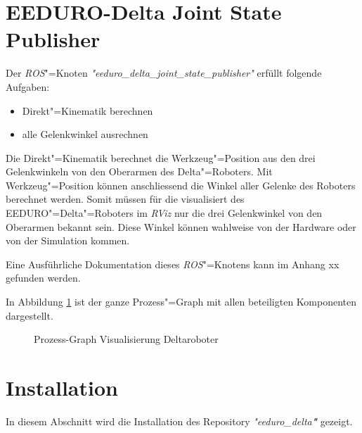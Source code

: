 \section{EEDURO-Delta Joint State Publisher}
Der \textit{ROS}"=Knoten \textit{\textit{"}eeduro\_delta\_joint\_state\_publisher\textit{"}} erfüllt folgende Aufgaben:
\begin{itemize}
\item Direkt"=Kinematik berechnen
\item alle Gelenkwinkel ausrechnen
\end{itemize}
Die Direkt"=Kinematik berechnet die Werkzeug"=Position aus den drei Gelenkwinkeln von den Oberarmen des Delta"=Roboters.
Mit Werkzeug"=Position können anschliessend die Winkel aller Gelenke des Roboters berechnet werden.
Somit müssen für die visualisiert des EEDURO"=Delta"=Roboters im \textit{RViz} nur die drei Gelenkwinkel von den Oberarmen bekannt sein.
Diese Winkel können wahlweise von der Hardware oder von der Simulation kommen.

Eine Ausführliche Dokumentation dieses \textit{ROS}"=Knotens kann im Anhang xx gefunden werden. %

In Abbildung \ref{Ab:prozess} ist der ganze Prozess"=Graph mit allen beteiligten Komponenten dargestellt.

\begin{figure}[ht!]
	\centering
{}
	\caption{Prozess-Graph Visualisierung Deltaroboter}
	\label{Ab:prozess}
\end{figure}

\section{Installation}
In diesem Abschnitt wird die Installation des Repository \textit{\textit{"}eeduro\_delta\textbf{"}} gezeigt.

